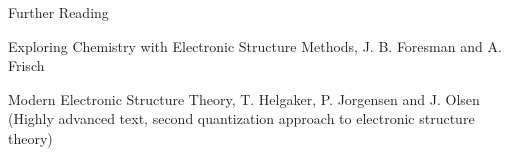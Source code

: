 \documentclass[slidestop,mathserif,compress,xcolor=svgnames]{beamer}
\begin{document}
\begin{frame}[allowframebreaks]
\begin{block}{\small Further Reading}
\begin{itemize}
{\item Exploring Chemistry with Electronic Structure Methods, J. B. Foresman and A. Frisch
\item[$\vardiamond$]Modern Electronic Structure Theory, T. Helgaker, P. Jorgensen and J. Olsen (Highly advanced text, second quantization approach to electronic structure theory)
}
\end{itemize}
\end{block}
\end{frame}
\end{document}
